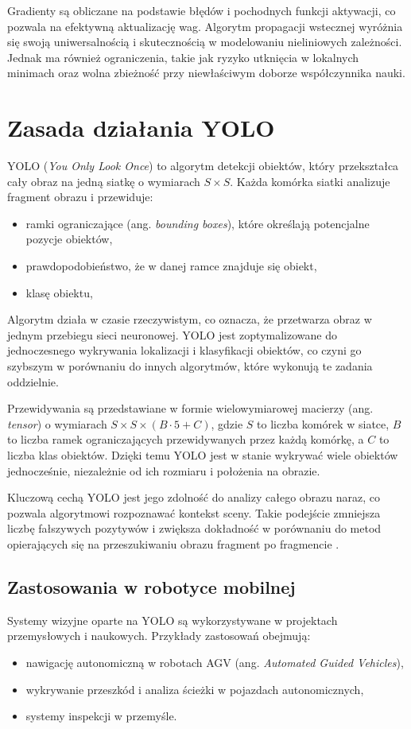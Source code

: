 \documentclass[a4paper,twoside,12pt]{book}
\begin{document}
Gradienty są obliczane na podstawie błędów i pochodnych funkcji aktywacji, co pozwala na efektywną aktualizację wag. 
Algorytm propagacji wstecznej wyróżnia się swoją uniwersalnością i skutecznością w modelowaniu nieliniowych zależności. Jednak ma również ograniczenia, takie jak ryzyko utknięcia w lokalnych minimach oraz wolna zbieżność przy niewłaściwym doborze współczynnika nauki.

\section{Zasada działania YOLO}
YOLO (\textit{You Only Look Once}) to algorytm detekcji obiektów, który przekształca cały obraz na jedną siatkę o wymiarach \( S \times S \). Każda komórka siatki analizuje fragment obrazu i przewiduje:
\begin{itemize}
    \item ramki ograniczające (ang. \textit{bounding boxes}), które określają potencjalne pozycje obiektów,
    \item prawdopodobieństwo, że w danej ramce znajduje się obiekt,
    \item klasę obiektu,
\end{itemize}

Algorytm działa w czasie rzeczywistym, co oznacza, że przetwarza obraz w jednym przebiegu sieci neuronowej. YOLO jest zoptymalizowane do jednoczesnego wykrywania lokalizacji i klasyfikacji obiektów, co czyni go szybszym w porównaniu do innych algorytmów, które wykonują te zadania oddzielnie.

Przewidywania są przedstawiane w formie wielowymiarowej macierzy (ang. \textit{tensor}) o wymiarach \( S \times S \times (B \cdot 5 + C) \), gdzie \( S \) to liczba komórek w siatce, \( B \) to liczba ramek ograniczających przewidywanych przez każdą komórkę, a \( C \) to liczba klas obiektów. Dzięki temu YOLO jest w stanie wykrywać wiele obiektów jednocześnie, niezależnie od ich rozmiaru i położenia na obrazie.

Kluczową cechą YOLO jest jego zdolność do analizy całego obrazu naraz, co pozwala algorytmowi rozpoznawać kontekst sceny. Takie podejście zmniejsza liczbę fałszywych pozytywów i zwiększa dokładność w porównaniu do metod opierających się na przeszukiwaniu obrazu fragment po fragmencie \cite{bib:redmon_yolo}.


\subsection{Zastosowania w robotyce mobilnej}
Systemy wizyjne oparte na YOLO są wykorzystywane w projektach przemysłowych i naukowych. Przykłady zastosowań obejmują:
\begin{itemize}
    \item nawigację autonomiczną w robotach AGV (ang. \textit{Automated Guided Vehicles}),
    \item wykrywanie przeszkód i analiza ścieżki w pojazdach autonomicznych,
    \item systemy inspekcji w przemyśle.
\end{itemize}
\end{document}
